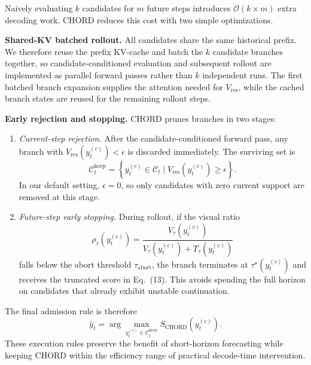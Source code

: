 \documentclass[sigconf,anonymous]{acmart}
\begin{document}
Naively evaluating $k$ candidates for $m$ future steps introduces $\mathcal{O}(k \times m)$ extra decoding work. CHORD reduces this cost with two simple optimizations.

\noindent\textbf{Shared-KV batched rollout.} All candidates share the same historical prefix. We therefore reuse the prefix KV-cache and batch the $k$ candidate branches together, so candidate-conditioned evaluation and subsequent rollout are implemented as parallel forward passes rather than $k$ independent runs. The first batched branch expansion supplies the attention needed for $V_{\mathrm{res}}$, while the cached branch states are reused for the remaining rollout steps.

\noindent\textbf{Early rejection and stopping.} CHORD prunes branches in two stages:
\begin{enumerate}
    \item \textit{Current-step rejection.} After the candidate-conditioned forward pass, any branch with $V_{\mathrm{res}}(y_t^{(c)}) < \epsilon$ is discarded immediately. The surviving set is
    \begin{equation}
        \mathcal{C}^{\mathrm{keep}}_t = \left\{y_t^{(c)} \in \mathcal{C}_t \mid V_{\mathrm{res}}(y_t^{(c)}) \ge \epsilon \right\}.
    \end{equation}
    In our default setting, $\epsilon=0$, so only candidates with zero current support are removed at this stage.
    \item \textit{Future-step early stopping.} During rollout, if the visual ratio
    \begin{equation}
        \rho_\tau(y_t^{(c)}) = \frac{V_\tau(y_t^{(c)})}{V_\tau(y_t^{(c)}) + T_\tau(y_t^{(c)})}
    \end{equation}
    falls below the abort threshold $\tau_{\mathrm{abort}}$, the branch terminates at $\tau^\star(y_t^{(c)})$ and receives the truncated score in Eq.~(13). This avoids spending the full horizon on candidates that already exhibit unstable continuation.
\end{enumerate}

The final admission rule is therefore
\begin{equation}
    \hat{y}_t = \arg\max_{y_t^{(c)} \in \mathcal{C}^{\mathrm{keep}}_t} S_{\mathrm{CHORD}}(y_t^{(c)}).
\end{equation}
These execution rules preserve the benefit of short-horizon forecasting while keeping CHORD within the efficiency range of practical decode-time intervention.
\end{document}
